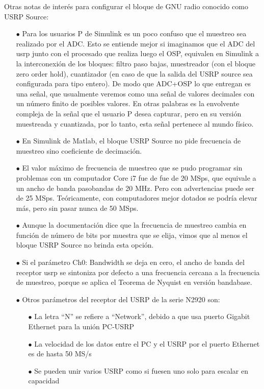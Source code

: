 Otras notas de interés para configurar el bloque de GNU radio conocido como USRP Source: \\

\begin{itemize}
	\item [$\bullet$] Para los usuarios P de Simulink es un poco confuso que el muestreo sea realizado por el ADC. Esto se entiende mejor si imaginamos que el ADC del usrp junto con el procesado que realiza luego el OSP, equivalen en Simulink a la interconexión de los bloques: filtro paso bajas, muestreador (con el bloque zero order hold), cuantizador (en caso de que la salida del USRP source sea configurada para  tipo entero). De modo que ADC+OSP lo que entregan es una señal, que usualmente veremos como una señal de valores decimales con un número finito de posibles valores. En otras palabras es la envolvente compleja de la señal que el usuario P desea capturar, pero en su versión muestreada y cuantizada, por lo tanto, esta señal pertenece al mundo físico.
	\item [$\bullet$] En Simulink de Matlab, el bloque USRP Source no pide frecuencia de muestreo sino coeficiente de decimación.
	\item [$\bullet$] El valor máximo de frecuencia de muestreo que se pudo programar sin problemas con un computador Core i7 fue de  fue de 20 MSps, que equivale a un ancho de banda pasobandas de 20 MHz. Pero con advertencias puede ser de 25 MSps. Teóricamente, con computadores mejor dotados se podría elevar más, pero sin pasar nunca de 50 MSps.
	\item [$\bullet$] Aunque la documentación dice que la frecuencia de muestreo cambia en función de número de bits por muestra que se elija, vimos que al menos el bloque USRP Source no brinda esta opción.
	\item [$\bullet$] Si el parámetro Ch0: Bandwidth se deja en cero, el ancho de banda del receptor usrp se sintoniza por defecto a una frecuencia cercana a la frecuencia de muestreo, porque se aplica el Teorema de Nyquist en versión bandabase.
	\item [$\bullet$] Otros parámetros del receptor del USRP de la serie N2920 son:
	\begin{itemize}
		\item [$\bullet$] La letra “N” se refiere a “Network”, debido a que usa puerto Gigabit  Ethernet para la unión PC-USRP
		\item [$\bullet$] La velocidad de los datos entre el PC y el USRP por el puerto Ethernet es de hasta 50 MS/s
		\item [$\bullet$] Se pueden unir varios USRP como si fuesen uno solo para escalar en capacidad
	\end{itemize}
\end{itemize}


